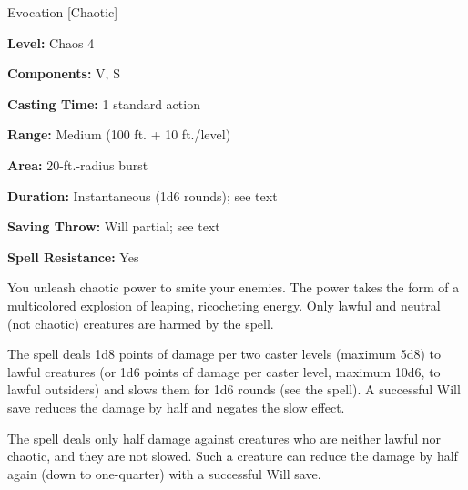 
Evocation [Chaotic]

\textbf{Level:} Chaos 4

\textbf{Components:} V, S

\textbf{Casting Time:} 1 standard action

\textbf{Range:} Medium (100 ft. + 10 ft./level)

\textbf{Area:} 20-ft.-radius burst

\textbf{Duration:} Instantaneous (1d6 rounds); see text

\textbf{Saving Throw:} Will partial; see text

\textbf{Spell Resistance:} Yes

You unleash chaotic power to smite your enemies. The power takes the form of a 
multicolored explosion of leaping, ricocheting energy. Only lawful and neutral 
(not chaotic) creatures are harmed by the spell.

The spell deals 1d8 points of damage per two caster levels (maximum 5d8) to lawful 
creatures (or 1d6 points of damage per caster level, maximum 10d6, to lawful outsiders) 
and slows them for 1d6 rounds (see the  spell). A successful Will 
save reduces the damage by half and negates the slow effect.

The spell deals only half damage against creatures who are neither lawful nor chaotic, 
and they are not slowed. Such a creature can reduce the damage by half again (down 
to one-quarter) with a successful Will save.

